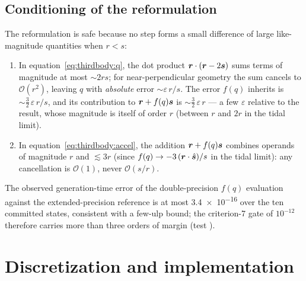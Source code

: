 \subsection{Conditioning of the reformulation}

The reformulation is safe because no step forms a small difference of
large like-magnitude quantities when $r < s$:
\begin{enumerate}
  \item In equation~\eqref{eq:thirdbody:q}, the dot product
    $\bm{r} \cdot (\bm{r} - 2\bm{s})$ sums terms of magnitude at most
    $\sim 2 r s$; for near-perpendicular geometry the sum cancels to
    $\mathcal{O}(r^{2})$, leaving $q$ with \emph{absolute} error
    $\sim \varepsilon\, r/s$. The error $f(q)$ inherits is
    $\sim \tfrac{3}{2}\,\varepsilon\, r/s$, and its contribution to
    $\bm{r} + f(q)\bm{s}$ is $\sim \tfrac{3}{2}\,\varepsilon\, r$ ---
    a few $\varepsilon$ relative to the result, whose magnitude is
    itself of order $r$ (between $r$ and $2r$ in the tidal limit).
  \item In equation~\eqref{eq:thirdbody:accel}, the addition
    $\bm{r} + f(q)\bm{s}$ combines operands of magnitude $r$ and
    $\lesssim 3r$ (since $f(q) \to -3\,(\bm{r}\cdot\hat{\bm{s}})/s$ in
    the tidal limit): any cancellation is $\mathcal{O}(1)$, never
    $\mathcal{O}(s/r)$.
\end{enumerate}
The observed generation-time error of the double-precision $f(q)$
evaluation against the extended-precision reference is at most
\num{3.4e-16} over the ten committed states, consistent with a few-ulp
bound; the criterion-7 gate of $10^{-12}$ therefore carries more than
three orders of margin (test
).

\section{Discretization and implementation}
\label{sec:thirdbody:implementation}

